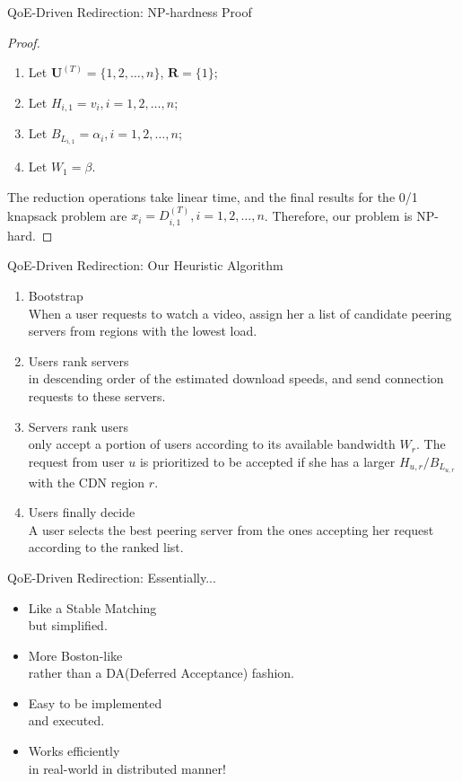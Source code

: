 \documentclass{beamer}
\newcommand{\CDNRegions}{\mathbf{R}}
\newcommand{\Users}{\mathbf{U}}
\newcommand{\Redirect}{D}
\newcommand{\bandwidth}{W}
\newcommand{\Version}{L}
\newcommand{\USPref}{H}
\newcommand{\Bitrate}{B}
\begin{document}
\begin{frame}{QoE-Driven Redirection: NP-hardness Proof}
	\begin{proof}
	\begin{enumerate}
		\item<1> Let $\Users^{(T)} = \{1,2,\ldots,n\}$, $\CDNRegions=\{1\}$;
		\item<1> Let $\USPref_{i,1} = v_i, i = 1,2,\dots,n$;
		\item<1> Let $\Bitrate_{\Version_{i,1}} = \alpha_i, i=1,2,\ldots,n$;
		\item<1> Let $\bandwidth_1 = \beta$.
	\end{enumerate}
	The reduction operations take linear time, and the final results for the 0/1 knapsack problem are $x_i = \Redirect^{(T)}_{i,1}, i=1,2,\dots,n$. Therefore, our problem is NP-hard. 
	\end{proof}
\end{frame}

\begin{frame}{QoE-Driven Redirection: Our Heuristic Algorithm}
	\begin{enumerate}
		\item<1> Bootstrap\\
		When a user requests to watch a video, assign her a list of candidate peering servers from regions with the lowest load.
		\item<1> Users rank servers\\
		in descending order of the estimated download speeds, and send connection requests to these servers.
		\item<1> Servers rank users\\
		only accept a portion of users according to its available bandwidth $\bandwidth_r$. The request from user $u$ is prioritized to be accepted if she has a larger $\USPref_{u,r}/\Bitrate_{\Version_{u,r}}$ with the CDN region $r$. 
		\item<1> Users finally decide\\
		A user selects the best peering server from the ones accepting her request according to the ranked list.
	\end{enumerate}
\end{frame}

\begin{frame}{QoE-Driven Redirection: Essentially...}
	\begin{itemize}
		\item<1> Like a Stable Matching\\
		but simplified.
		\item<1> More Boston-like\\
		rather than a DA(Deferred Acceptance) fashion.
		\item<1> Easy to be implemented\\
		and executed.
		\item<1> Works efficiently\\
		 in real-world in distributed manner!
	\end{itemize}
\end{frame}
\end{document}

